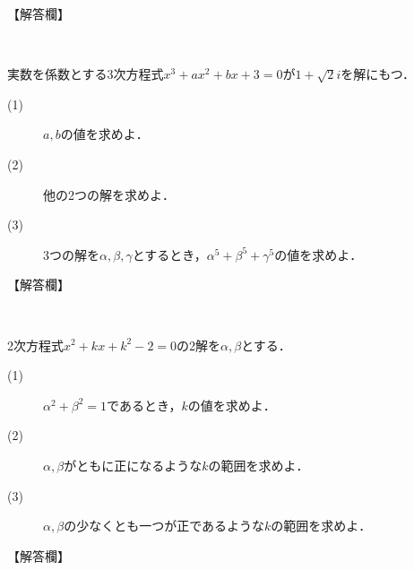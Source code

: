\documentclass[b5paper]{jsarticle}
\begin{document}
【解答欄】

\newpage


　


\newpage
\toi%

実数を係数とする3次方程式$x^3+ax^2+bx+3=0$が$1+\sqrt2 i$を解にもつ．
\begin{description}
\item[(1)] $a,b$の値を求めよ．
\item[(2)]  他の2つの解を求めよ．
\item[(3)] 3つの解を$\alpha ,\beta ,\gamma$とするとき，$\alpha^5+\beta^5+\gamma^5$の値を求めよ．
\end{description}

【解答欄】

\newpage

　


\newpage
\toi%


2次方程式$x^2+kx+k^2-2=0$の2解を$\alpha ,\beta$とする．
\begin{description}
\item[(1)] $\alpha^2+\beta^2=1$であるとき，$k$の値を求めよ．
\item[(2)] $\alpha ,\beta$がともに正になるような$k$の範囲を求めよ．
\item[(3)] $\alpha ,\beta$の少なくとも一つが正であるような$k$の範囲を求めよ．
\end{description}

【解答欄】

\newpage


　



\newpage
\end{document}
